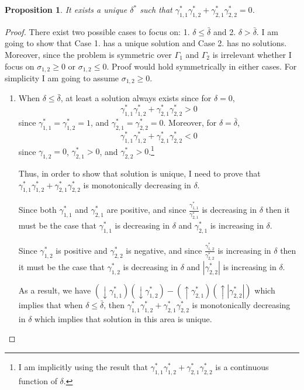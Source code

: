 \documentclass[14pt]{article}
\newtheorem{prop}{Proposition}
\begin{document}
{\begin{prop}
	It exists a unique $\delta^*$ such that $\gamma_{1,1}^*\gamma_{1,2}^* + \gamma_{2,1}^*\gamma_{2,2}^* = 0$.
\end{prop}
\begin{proof}
	There exist two possible cases to focus on: 1. $\delta \leq \bar{\delta}$ and 2. $\delta > \bar{\delta}$. I am going to show that Case 1. has a unique solution and Case 2. has no solutions. Moreover, since the problem is symmetric over $\Gamma_1$ and $\Gamma_2$ is irrelevant whether I focus on $\sigma_{1,2} \geq 0$ or $\sigma_{1,2} \leq 0$. Proof would hold symmetrically in either cases. For simplicity I am going to assume $\sigma_{1,2} \geq 0$.
	\begin{enumerate}
		\item When $\delta \leq \bar{\delta}$, at least a solution always exists since for $\delta = 0$,
		$$
		\gamma_{1,1}^*\gamma_{1,2}^* + \gamma_{2,1}^*\gamma_{2,2}^* > 0
		$$ 
		since $\gamma_{1,1}^* = \gamma_{1,2}^* = 1$, and $\gamma_{2,1}^* = \gamma_{2,2}^* = 0$. Moreover, for $\delta = \bar{\delta}$,
				$$
		\gamma_{1,1}^*\gamma_{1,2}^* + \gamma_{2,1}^*\gamma_{2,2}^* < 0
		$$
		since $\gamma_{1,2} = 0$, $\gamma_{2,1}^* > 0$, and $\gamma_{2,2}^* > 0$.\footnote{I am implicitly using the result that $\gamma_{1,1}^*\gamma_{1,2}^* + \gamma_{2,1}^*\gamma_{2,2}^*$ is a continuous function of $\delta$.}
		
		Thus, in order to show that solution is unique, I need to prove that $\gamma_{1,1}^*\gamma_{1,2}^* + \gamma_{2,1}^*\gamma_{2,2}^*$ is monotonically decreasing in $\delta$.   
		
		Since both $\gamma_{1,1}^*$ and $\gamma_{2,1}^*$ are positive, and since $\frac{\gamma_{1,1}^*}{\gamma_{2,1}^*}$ is decreasing in $\delta$ then it must be the case that $\gamma_{1,1}^*$ is decreasing in $\delta$ and $\gamma_{2,1}^*$ is increasing in $\delta$.
		
	    Since $\gamma_{1,2}^*$ is positive and $\gamma_{2,2}^*$ is negative, and since $\frac{\gamma_{1,2}^*}{\gamma_{2,2}^*}$ is increasing in $\delta$ then it must be the case that $\gamma_{1,2}^*$ is decreasing in $\delta$ and $|\gamma_{2,2}^*|$ is increasing in $\delta$.
	    
	    As a result, we have $( \downarrow \gamma_{1,1}^* ) ( \downarrow \gamma_{1,2}^*) - ( \uparrow \gamma_{2,1}^*) ( \uparrow|\gamma_{2,2}^*|)$ which implies that when $\delta \leq \bar{\delta}$, then $\gamma_{1,1}^*\gamma_{1,2}^* + \gamma_{2,1}^*\gamma_{2,2}^*$ is monotonically decreasing in $\delta$ which implies that solution in this area is unique.
	    

\end{enumerate}
\end{proof}}
\end{document}

